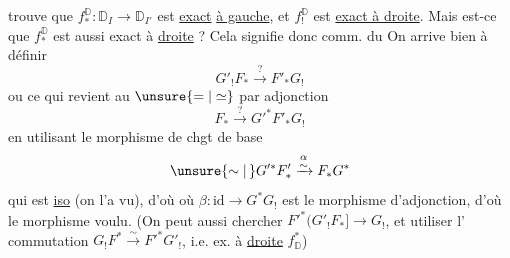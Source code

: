 trouve que $f^{\mathbb D}_*:\mathbb D_I\longrightarrow\mathbb D_{I'}$ est \uline{exact} \uline{à gauche}, et  $f^{\mathbb D}_!$ est \uline{exact à droite}. Mais est-ce que $f^{\mathbb D}_*$ est aussi exact à \uline{droite} ? Cela signifie donc comm. du
On arrive bien à définir
\[
G'_!F_*\xrightarrow{?}F'_*G_!
\]
ou ce qui revient au $\unsure{=|\simeq}$ par adjonction
\[
F_*\xrightarrow{?}G'^*F'_*G_!
\]
en utilisant le morphisme de chgt de base
\[
\unsure{\sim|\,}G'^*F'_*\xrightarrow{\substack{\alpha\\\sim}}F_*G^*
\]
qui est \uline{iso} (on l'a vu), d'où
où $\beta:\mathrm{id}\longrightarrow G^*G_!$ \unsure{)} est le morphisme d'adjonction, d'où le morphisme voulu. (On peut aussi chercher $F'^*(G'_!F_*]\longrightarrow G_!$, et utiliser l' commutation $G_!F^*\xrightarrow{\sim}F'^*G'_!$, i.e. ex. à \uline{droite}   $f^*_{\mathbb D}$)
